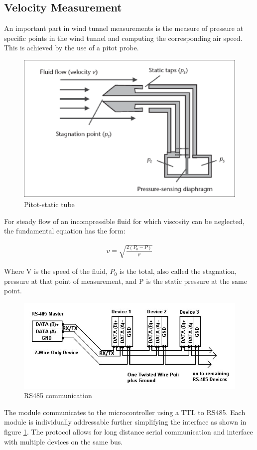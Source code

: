 \subsection{Velocity Measurement}
An important part in wind tunnel measurements is the measure of pressure at specific points in the wind tunnel and computing the corresponding air speed. This is achieved by the use of a pitot probe.
\begin{center}
	\begin{figure}[H]
		\centering
		\includegraphics[width=0.6\linewidth]{Figures/pitot}
		\caption[Pitot-static tube]{Pitot-static tube \cite{viquerat_continuous_2006}}
	\end{figure}
\end{center}
For steady flow of an incompressible fluid for which viscosity can be neglected, the fundamental equation has the form\cite{viquerat_continuous_2006}:

\begin{ceqn}
	\begin{align}
		v = \sqrt{\frac{2(P_{0} - P)}{\rho}}
	\end{align}
\end{ceqn}

Where V is the speed of the fluid, $P_{0}$ is the total, also called the stagnation, pressure at that point of measurement, and P is the static pressure at the same point.

\begin{center}
	\begin{figure}[H]
		\centering
		\includegraphics{Figures/modbus}
		\caption[RS485 communication]{RS485 communication}
		\label{fig:rs485}
	\end{figure}
\end{center}
The module communicates to the microcontroller using a TTL to RS485. Each module is individually addressable further simplifying the interface as shown in figure \ref{fig:rs485}.
The protocol allows for long distance serial communication and interface with multiple devices on the same bus.

